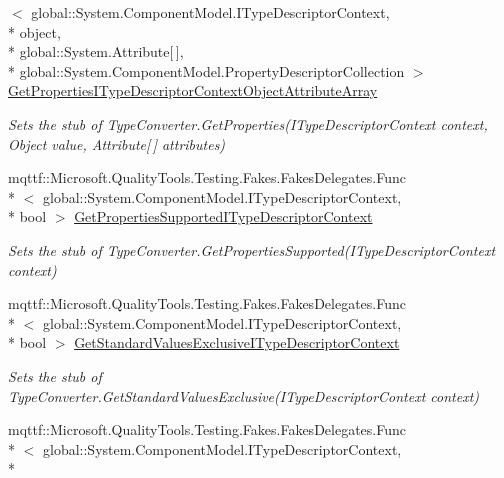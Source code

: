 \begin{DoxyCompactItemize}
$<$ global\-::\-System.\-Component\-Model.\-I\-Type\-Descriptor\-Context, \\*
object, \\*
global\-::\-System.\-Attribute\mbox{[}$\,$\mbox{]}, \\*
global\-::\-System.\-Component\-Model.\-Property\-Descriptor\-Collection $>$ \hyperlink{class_system_1_1_fakes_1_1_stub_uri_type_converter_aeb1ec0652fa1f22fb25f5795202c62af}{Get\-Properties\-I\-Type\-Descriptor\-Context\-Object\-Attribute\-Array}
\begin{DoxyCompactList}\small\item\em Sets the stub of Type\-Converter.\-Get\-Properties(\-I\-Type\-Descriptor\-Context context, Object value, Attribute\mbox{[}$\,$\mbox{]} attributes)\end{DoxyCompactList}\item 
mqttf\-::\-Microsoft.\-Quality\-Tools.\-Testing.\-Fakes.\-Fakes\-Delegates.\-Func\\*
$<$ global\-::\-System.\-Component\-Model.\-I\-Type\-Descriptor\-Context, \\*
bool $>$ \hyperlink{class_system_1_1_fakes_1_1_stub_uri_type_converter_a2e48bfcf3defbb949743bd72f18f6457}{Get\-Properties\-Supported\-I\-Type\-Descriptor\-Context}
\begin{DoxyCompactList}\small\item\em Sets the stub of Type\-Converter.\-Get\-Properties\-Supported(\-I\-Type\-Descriptor\-Context context)\end{DoxyCompactList}\item 
mqttf\-::\-Microsoft.\-Quality\-Tools.\-Testing.\-Fakes.\-Fakes\-Delegates.\-Func\\*
$<$ global\-::\-System.\-Component\-Model.\-I\-Type\-Descriptor\-Context, \\*
bool $>$ \hyperlink{class_system_1_1_fakes_1_1_stub_uri_type_converter_a6cf1ab74cb43aef3d10f39f85e7adf45}{Get\-Standard\-Values\-Exclusive\-I\-Type\-Descriptor\-Context}
\begin{DoxyCompactList}\small\item\em Sets the stub of Type\-Converter.\-Get\-Standard\-Values\-Exclusive(\-I\-Type\-Descriptor\-Context context)\end{DoxyCompactList}\item 
mqttf\-::\-Microsoft.\-Quality\-Tools.\-Testing.\-Fakes.\-Fakes\-Delegates.\-Func\\*
$<$ global\-::\-System.\-Component\-Model.\-I\-Type\-Descriptor\-Context, \\*

\end{DoxyCompactItemize}
